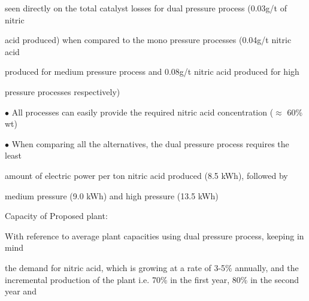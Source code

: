 \documentclass[a4paper,portrait,12pt]{article}
\begin{document}
\begin{flushleft}
seen directly on the total catalyst losses for dual pressure process (0.03g/t of nitric
\end{flushleft}


\begin{flushleft}
acid produced) when compared to the mono pressure processes (0.04g/t nitric acid
\end{flushleft}


\begin{flushleft}
produced for medium pressure process and 0.08g/t nitric acid produced for high
\end{flushleft}


\begin{flushleft}
pressure processes respectively)
\end{flushleft}


\begin{flushleft}
$\bullet$ All processes can easily provide the required nitric acid concentration ($\approx$ 60\% wt)
\end{flushleft}


\begin{flushleft}
$\bullet$ When comparing all the alternatives, the dual pressure process requires the least
\end{flushleft}


\begin{flushleft}
amount of electric power per ton nitric acid produced (8.5 kWh), followed by
\end{flushleft}


\begin{flushleft}
medium pressure (9.0 kWh) and high pressure (13.5 kWh)
\end{flushleft}





\begin{flushleft}
Capacity of Proposed plant:
\end{flushleft}


\begin{flushleft}
With reference to average plant capacities using dual pressure process, keeping in mind
\end{flushleft}


\begin{flushleft}
the demand for nitric acid, which is growing at a rate of 3-5\% annually, and the incremental production of the plant i.e. 70\% in the first year, 80\% in the second year and
\end{flushleft}
\end{document}
